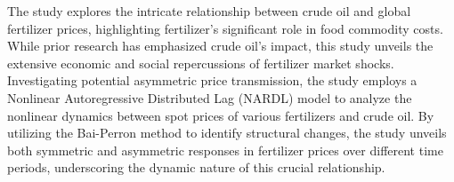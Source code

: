 
\begin{Abstrakt}
    The study explores the intricate relationship between crude oil and global fertilizer prices, highlighting fertilizer's significant role in food commodity costs. While prior research has emphasized crude oil's impact, this study unveils the extensive economic and social repercussions of fertilizer market shocks. Investigating potential asymmetric price transmission, the study employs a Nonlinear Autoregressive Distributed Lag (NARDL) model to analyze the nonlinear dynamics between spot prices of various fertilizers and crude oil. By utilizing the Bai-Perron method to identify structural changes, the study unveils both symmetric and asymmetric responses in fertilizer prices over different time periods, underscoring the dynamic nature of this crucial relationship.
\end{Abstrakt}



\clearpage